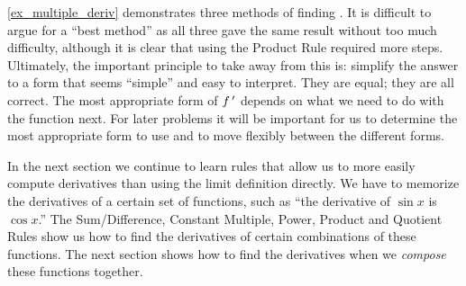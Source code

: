 \autoref{ex_multiple_deriv} demonstrates three methods of finding \fp. It is difficult to argue for a ``best method'' as all three gave the same result without too much difficulty, although it is clear that using the Product Rule required more steps. Ultimately, the important principle to take away from this is: simplify the answer to a form that seems ``simple'' and easy to interpret.  They are equal; they are all correct. The most appropriate form of $f\,'$ depends on what we need to do with the function next. For later problems it will be important for us to determine the most appropriate form to use and to move flexibly between the different forms.
		
In the next section we continue to learn rules that allow us to more easily compute derivatives than using the limit definition directly. We have to memorize the derivatives of a certain set of functions, such as ``the derivative of $\sin x$ is $\cos x$.'' The Sum/Difference, Constant Multiple, Power, Product and Quotient Rules show us how to find the derivatives of certain combinations of these functions. The next section shows how to find the derivatives when we \emph{compose} these functions together.

